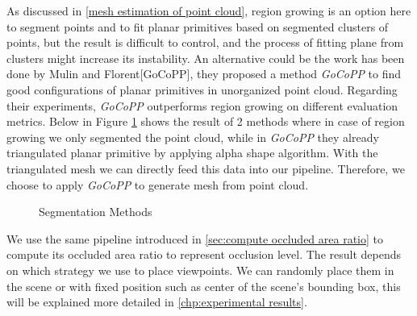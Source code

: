 \documentclass[11pt, a4paper,oneside,chapterprefix=false]{scrbook}
\begin{document}
As discussed in \ref{mesh estimation of point cloud}, region growing is an option here to segment points and to fit planar primitives based on segmented clusters of points, but the result is difficult to control, and the process of fitting plane from clusters might increase its instability. An alternative could be the work has been done by Mulin and Florent[GoCoPP], they proposed a method \emph{GoCoPP} to find good configurations of planar primitives in unorganized point cloud. Regarding their experiments, \emph{GoCoPP} outperforms region growing on different evaluation metrics. Below in Figure \ref{segmentation results} shows the result of 2 methods where in case of region growing we only segmented the point cloud, while in \emph{GoCoPP} they already triangulated planar primitive by applying alpha shape algorithm. With the triangulated mesh we can directly feed this data into our pipeline. Therefore, we choose to apply \emph{GoCoPP} to generate mesh from point cloud.

\begin{figure}[H]
    \centering
      \label{fig:region growing} 
     \label{fig:gocopp}
    \caption{Segmentation Methods}
    \label{segmentation results}
\end{figure}

We use the same pipeline introduced in \ref{sec:compute occluded area ratio} to compute its occluded area ratio to represent occlusion level. The result depends on which strategy we use to place viewpoints. We can randomly place them in the scene or with fixed position such as center of the scene's bounding box, this will be explained more detailed in \ref{chp:experimental results}.
\end{document}
